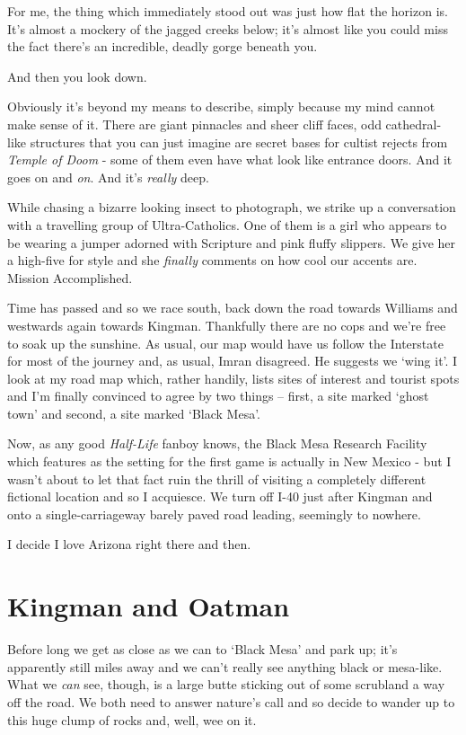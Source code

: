 \documentclass[a5paper,titlepage,draft]{book}
\begin{document}
For me, the thing which immediately stood out was just how flat the horizon is.  It's almost a mockery of the jagged creeks below; it's almost like you could miss the fact there's an incredible, deadly gorge beneath you.

And then you look down.

Obviously it's beyond my means to describe, simply because my mind cannot make sense of it.  There are giant pinnacles and sheer cliff faces, odd cathedral-like structures that you can just imagine are secret bases for cultist rejects from \emph{Temple of Doom} - some of them even have what look like entrance doors.  And it goes on and \emph{on}.  And it's \emph{really} deep.

While chasing a bizarre looking insect to photograph, we strike up a conversation with a travelling group of Ultra-Catholics.  One of them is a girl who appears to be wearing a jumper adorned with Scripture and pink fluffy slippers.  We give her a high-five for style and she \emph{finally} comments on how cool our accents are.  Mission Accomplished.

Time has passed and so we race south, back down the road towards Williams and westwards again towards Kingman.  Thankfully there are no cops and we're free to soak up the sunshine.  As usual, our map would have us follow the Interstate for most of the journey and, as usual, Imran disagreed.  He suggests we `wing it'.  I look at my road map which, rather handily, lists sites of interest and tourist spots and I'm finally convinced to agree by two things -- first, a site marked `ghost town' and second, a site marked `Black Mesa'.

Now, as any good \emph{Half-Life} fanboy knows, the Black Mesa Research Facility which features as the setting for the first game is actually in New Mexico - but I wasn't about to let that fact ruin the thrill of visiting a completely different fictional location and so I acquiesce.  We turn off I-40 just after Kingman and onto a single-carriageway barely paved road leading, seemingly to nowhere.

I decide I love Arizona right there and then.

\section*{Kingman and Oatman}

Before long we get as close as we can to `Black Mesa' and park up; it's apparently still miles away and we can't really see anything black or mesa-like.  What we \emph{can} see, though, is a large butte sticking out of some scrubland a way off the road.  We both need to answer nature's call and so decide to wander up to this huge clump of rocks and, well, wee on it.
\end{document}
